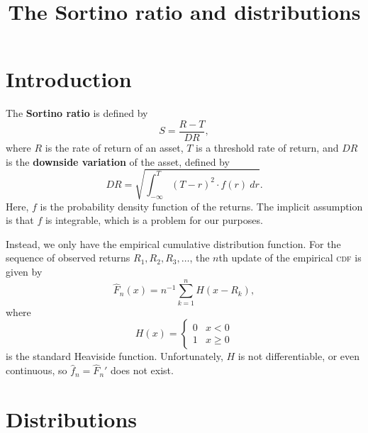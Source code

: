 \documentclass[12pt]{article}
\title{%
  The Sortino ratio and distributions
}
\newcommand{\inv}{{}^{-1}}
\renewcommand{\hat}{\widehat}
\begin{document}
\maketitle

\section{Introduction}

The \textbf{Sortino ratio} is defined by
\begin{equation*}
  S = \frac{R-T}{\textit{DR}},
\end{equation*}
where $R$ is the rate of return of an asset, $T$ is a threshold rate of return,
and $\textit{DR}$ is the \textbf{downside variation} of the asset, defined by
\begin{equation*}
  \textit{DR} = \sqrt{
    \int_{-\infty}^{T} (T-r)^2 \cdot f(r) \ dr
  }.
\end{equation*}
Here, $f$ is the probability density function of the returns. The implicit
assumption is that $f$ is integrable, which is a problem for our purposes.

Instead, we only have the empirical cumulative distribution function. For the
sequence of observed returns $R_1, R_2, R_3, \dots$, the $n$th update of the
empirical \textsc{cdf} is given by
\begin{equation*}
  \hat{F}_n(x) = n\inv \sum_{k=1}^{n} H(x - R_k),
\end{equation*}
where
\begin{equation*}
  H(x) = 
  \begin{cases}
    0 & x < 0 \\
    1 & x \geq 0
  \end{cases}
\end{equation*}
is the standard Heaviside function. Unfortunately, $H$ is not differentiable, or
even continuous, so $\hat{f}_n = \hat{F}_n'$ does not exist.

\section{Distributions}
\end{document}
